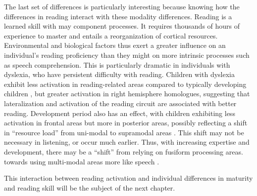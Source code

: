 The last set of differences is particularly interesting because knowing how the differences in reading interact with these modality differences. Reading is a learned skill with may component processes. It requires thousands of hours of experience to master and entails a reorganization of cortical resources. Environmental and biological factors thus exert a greater influence on an individual’s reading proficiency than they might on more intrinsic processes such as speech comprehension. This is particularly dramatic in individuals with dyslexia, who have persistent difficulty with reading. Children with dyslexia exhibit less activation in reading-related areas compared to typically developing children \citep{Pugh2000}, but greater activation in right hemisphere homologues, suggesting that lateralization and activation of the reading circuit are associated with better reading. Development period also has an effect, with children exhibiting less activation in frontal areas but more in posterior areas, possibly reflecting a shift in “resource load” from uni-modal to supramodal areas \citep{Berl2010}. This shift may not be necessary in listening, or occur much earlier. Thus, with increasing expertise and development, there may be a “shift” from relying on fusiform processing areas. towards using multi-modal areas more like speech \citep{Monzalvo}. 

This interaction between reading activation and individual differences in maturity and reading skill will be the subject of the next chapter.